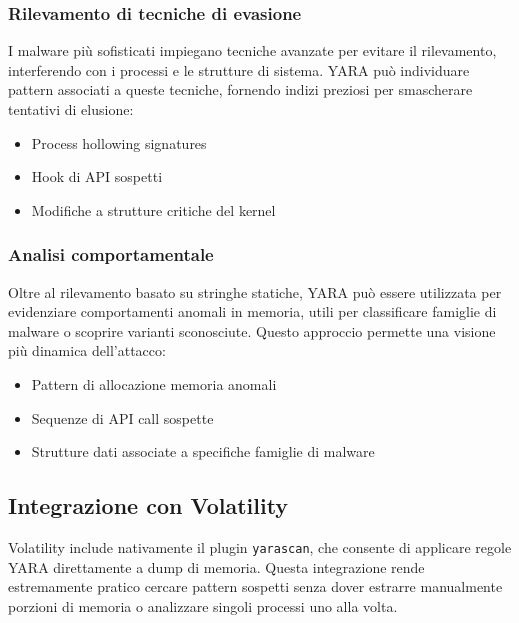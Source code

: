 \subsubsection{Rilevamento di tecniche di evasione}
I malware più sofisticati impiegano tecniche avanzate per evitare il rilevamento, interferendo con i processi e le strutture di sistema. YARA può individuare pattern associati a queste tecniche, fornendo indizi preziosi per smascherare tentativi di elusione:
\begin{itemize}
  \item Process hollowing signatures
  \item Hook di API sospetti
  \item Modifiche a strutture critiche del kernel
\end{itemize}

\subsubsection{Analisi comportamentale}
Oltre al rilevamento basato su stringhe statiche, YARA può essere utilizzata per evidenziare comportamenti anomali in memoria, utili per classificare famiglie di malware o scoprire varianti sconosciute. Questo approccio permette una visione più dinamica dell'attacco:
\begin{itemize}
  \item Pattern di allocazione memoria anomali
  \item Sequenze di API call sospette
  \item Strutture dati associate a specifiche famiglie di malware
\end{itemize}

\subsection{Integrazione con Volatility}

Volatility include nativamente il plugin \texttt{yarascan}, che consente di applicare regole YARA direttamente a dump di memoria. Questa integrazione rende estremamente pratico cercare pattern sospetti senza dover estrarre manualmente porzioni di memoria o analizzare singoli processi uno alla volta.

